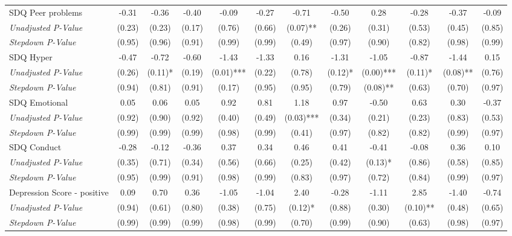 \begin{tabular}{l c c c c c c c c c c c}
SDQ Peer problems & -0.31 & -0.36 & -0.40 & -0.09 & -0.27 & -0.71 & -0.50 & 0.28 & -0.28 & -0.37 & -0.09 \\
\quad \textit{Unadjusted P-Value} & (0.23) & (0.23) & (0.17) & (0.76) & (0.66) & (0.07)** & (0.26) & (0.31) & (0.53) & (0.45) & (0.85) \\
\quad \textit{Stepdown P-Value} & (0.95) & (0.96) & (0.91) & (0.99) & (0.99) & (0.49) & (0.97) & (0.90) & (0.82) & (0.98) & (0.99) \\
SDQ Hyper & -0.47 & -0.72 & -0.60 & -1.43 & -1.33 & 0.16 & -1.31 & -1.05 & -0.87 & -1.44 & 0.15 \\
\quad \textit{Unadjusted P-Value} & (0.26) & (0.11)* & (0.19) & (0.01)*** & (0.22) & (0.78) & (0.12)* & (0.00)*** & (0.11)* & (0.08)** & (0.76) \\
\quad \textit{Stepdown P-Value} & (0.94) & (0.81) & (0.91) & (0.17) & (0.95) & (0.95) & (0.79) & (0.08)** & (0.63) & (0.70) & (0.97) \\
SDQ Emotional & 0.05 & 0.06 & 0.05 & 0.92 & 0.81 & 1.18 & 0.97 & -0.50 & 0.63 & 0.30 & -0.37 \\
\quad \textit{Unadjusted P-Value} & (0.92) & (0.90) & (0.92) & (0.40) & (0.49) & (0.03)*** & (0.34) & (0.21) & (0.23) & (0.83) & (0.53) \\
\quad \textit{Stepdown P-Value} & (0.99) & (0.99) & (0.99) & (0.98) & (0.99) & (0.41) & (0.97) & (0.82) & (0.82) & (0.99) & (0.97) \\
SDQ Conduct & -0.28 & -0.12 & -0.36 & 0.37 & 0.34 & 0.46 & 0.41 & -0.41 & -0.08 & 0.36 & 0.10 \\
\quad \textit{Unadjusted P-Value} & (0.35) & (0.71) & (0.34) & (0.56) & (0.66) & (0.25) & (0.42) & (0.13)* & (0.86) & (0.58) & (0.85) \\
\quad \textit{Stepdown P-Value} & (0.95) & (0.99) & (0.91) & (0.98) & (0.99) & (0.83) & (0.97) & (0.72) & (0.84) & (0.99) & (0.97) \\
Depression Score - positive & 0.09 & 0.70 & 0.36 & -1.05 & -1.04 & 2.40 & -0.28 & -1.11 & 2.85 & -1.40 & -0.74 \\
\quad \textit{Unadjusted P-Value} & (0.94) & (0.61) & (0.80) & (0.38) & (0.75) & (0.12)* & (0.88) & (0.30) & (0.10)** & (0.48) & (0.65) \\
\quad \textit{Stepdown P-Value} & (0.99) & (0.99) & (0.99) & (0.98) & (0.99) & (0.70) & (0.99) & (0.90) & (0.63) & (0.98) & (0.97) \\
\bottomrule
\end{tabular}
